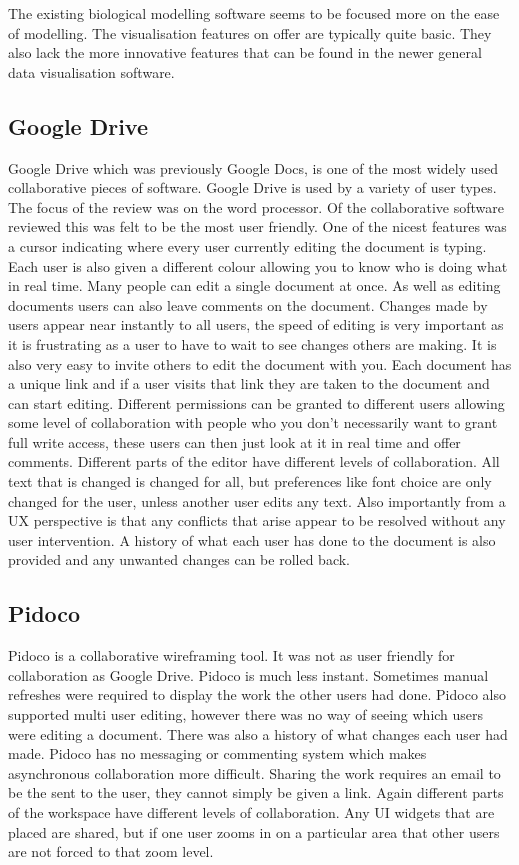 The existing biological modelling software seems to be focused more on the ease of modelling.  The visualisation features on offer are typically quite basic.  They also lack the more innovative features that can be found in the newer general data visualisation software.

\subsection{Google Drive}

Google Drive which was previously Google Docs, is one of the most widely used collaborative pieces of software.  Google Drive is used by a variety of user types.  The focus of the review was on the word processor.  Of the collaborative software reviewed this was felt to be the most user friendly.  One of the nicest features was a cursor indicating where every user currently editing the document is typing. Each user is also given a different colour allowing you to know who is doing what in real time.  Many people can edit a single document at once.  As well as editing documents users can also leave comments on the document.  Changes made by users appear near instantly to all users, the speed of editing is very important as it is frustrating as a user to have to wait to see changes others are making.  It is also very easy to invite others to edit the document with you.  Each document has a unique link and if a user visits that link they are taken to the document and can start editing.  Different permissions can be granted to different users allowing some level of collaboration with people who you don't necessarily want to grant full write access, these users can then just look at it in real time and offer comments.  Different parts of the editor have different levels of collaboration.  All text that is changed is changed for all, but preferences like font choice are only changed for the user, unless another user edits any text.  Also importantly from a \ac{UX} perspective is that any conflicts that arise appear to be resolved without any user intervention.  A history of what each user has done to the document is also provided and any unwanted changes can be rolled back.

\subsection{Pidoco}

Pidoco is a collaborative wireframing tool.  It was not as user friendly for collaboration as Google Drive.  Pidoco is much less instant.  Sometimes manual refreshes were required to display the work the other users had done.  Pidoco also supported multi user editing, however there was no way of seeing which users were editing a document. There was also a history of what changes each user had made.  Pidoco has no messaging or commenting system which makes asynchronous collaboration more difficult.  Sharing the work requires an email to be the sent to the user, they cannot simply be given a link.  Again different parts of the workspace have different levels of collaboration.  Any \ac{UI} widgets that are placed are shared, but if one user zooms in on a particular area that other users are not forced to that zoom level.

